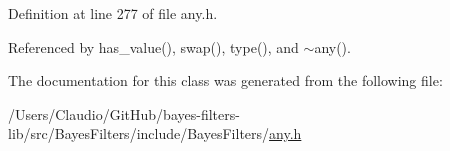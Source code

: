 Definition at line 277 of file any.\+h.



Referenced by has\+\_\+value(), swap(), type(), and $\sim$any().



The documentation for this class was generated from the following file\+:\begin{DoxyCompactItemize}
\item 
/\+Users/\+Claudio/\+Git\+Hub/bayes-\/filters-\/lib/src/\+Bayes\+Filters/include/\+Bayes\+Filters/\mbox{\hyperlink{any_8h}{any.\+h}}\end{DoxyCompactItemize}
